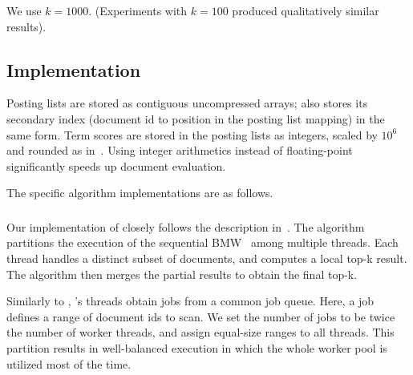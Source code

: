 We use  $k=1000$. 
(Experiments with $k=100$ produced qualitatively similar results).


\subsection{Implementation}
\label{ssec:implementation}

Posting lists are stored as contiguous uncompressed arrays;  {\pRA} also stores 
its secondary index (document id to position in the posting list mapping) in the same form. 
Term scores are stored in the posting lists as integers, scaled by $10^6$ and rounded as in~\cite{Bortnikov:2017}. 
Using integer arithmetics instead of floating-point significantly speeds up document evaluation. 

The specific algorithm implementations are as follows.

\subsubsection{\pBMW}
Our implementation of {\pBMW} closely follows the description in~\cite{rojas2013distributing}. The algorithm partitions the execution of the 
sequential BMW~\cite{Ding:2011} among multiple threads. Each thread handles a distinct subset of documents, and computes a local top-k 
result. The algorithm then merges the partial results to obtain the final top-k. 

Similarly to \alg, \pBMW's threads obtain jobs from a common job queue. Here, a job defines a range of document ids to scan. 
We set the number of jobs to be twice the number of worker threads, and assign equal-size ranges to all threads.  
This partition results in well-balanced execution in which the whole worker pool is utilized 
most of the time. 


